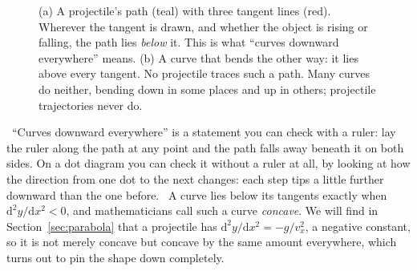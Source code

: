\documentclass[11pt,twoside,openany]{book}
\newcommand{\dd}{\mathrm{d}}
\newcounter{check}[chapter]
\newcommand{\viewtag}[3]{\fcolorbox{#2}{#3}{\footnotesize\textbf{\textcolor{#2}{#1}}}}
\newcommand{\elemtag}{\viewtag{Elementary}{elemcol}{elempale}}
\newcommand{\calctag}{\viewtag{Calculus}{calccol}{calcpale}}
\begin{document}
\begin{figure}[htb]
\centering
{}
\caption{(a) A projectile's path (teal) with three tangent lines (red). Wherever the tangent is drawn, and whether the object is rising or falling, the path lies \emph{below} it. This is what ``curves downward everywhere'' means. (b) A curve that bends the other way: it lies above every tangent. No projectile traces such a path. Many curves do neither, bending down in some places and up in others; projectile trajectories never do.}
\label{fig:curvedown}
\end{figure}

\begin{modelnote}
\elemtag\ ``Curves downward everywhere'' is a statement you can check with a ruler: lay the ruler along the path at any point and the path falls away beneath it on both sides. On a dot diagram you can check it without a ruler at all, by looking at how the direction from one dot to the next changes: each step tips a little further downward than the one before. \calctag\ A curve lies below its tangents exactly when $\dd^2 y/\dd x^2 < 0$, and mathematicians call such a curve \emph{concave}. We will find in Section~\ref{sec:parabola} that a projectile has $\dd^2 y/\dd x^2 = -g/v_x^2$, a negative constant, so it is not merely concave but concave by the same amount everywhere, which turns out to pin the shape down completely.
\end{modelnote}
\end{document}
